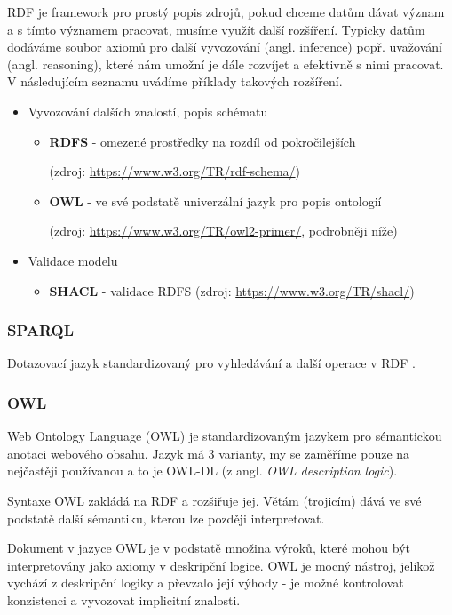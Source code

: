 RDF je framework pro prostý popis zdrojů, pokud chceme datům dávat význam a s tímto významem pracovat, musíme využít další rozšíření. Typicky datům dodáváme soubor axiomů pro další vyvozování (angl. inference) popř. uvažování (angl. reasoning), které nám umožní je dále rozvíjet a efektivně s nimi pracovat. V následujícím seznamu uvádíme příklady takových rozšíření.
\begin{itemize}
\item Vyvozování dalších znalostí, popis schématu
\begin{itemize}
\item \textbf{RDFS} - omezené prostředky na rozdíl od pokročilejších \par(zdroj: \url{https://www.w3.org/TR/rdf-schema/})
\item \textbf{OWL} - ve své podstatě univerzální jazyk pro popis ontologií \par(zdroj: \url{https://www.w3.org/TR/owl2-primer/}, podrobněji níže)
\end{itemize}
\item Validace modelu
\begin{itemize}
\item \textbf{SHACL} - validace RDFS (zdroj: \url{https://www.w3.org/TR/shacl/})
\end{itemize}
\end{itemize}

\subsubsection{SPARQL}
\noindent Dotazovací jazyk standardizovaný pro vyhledávání a další operace v RDF \cite{SPARQL}.\par
\subsubsection{OWL}
\noindent Web Ontology Language (OWL) je  standardizovaným jazykem pro sémantickou anotaci webového obsahu. Jazyk má 3 varianty, my se zaměříme pouze na nejčastěji používanou a to je OWL-DL (z angl. \textit{OWL description logic}).\par
Syntaxe OWL zakládá na RDF a rozšiřuje jej. Větám (trojicím) dává ve své podstatě další sémantiku, kterou lze později interpretovat.\par
Dokument v jazyce OWL je v podstatě množina výroků, které mohou být interpretovány jako axiomy v deskripční logice. OWL je mocný nástroj, jelikož vychází z deskripční logiky a převzalo její výhody - je možné kontrolovat konzistenci a vyvozovat implicitní znalosti. \cite{Stephan2007}

